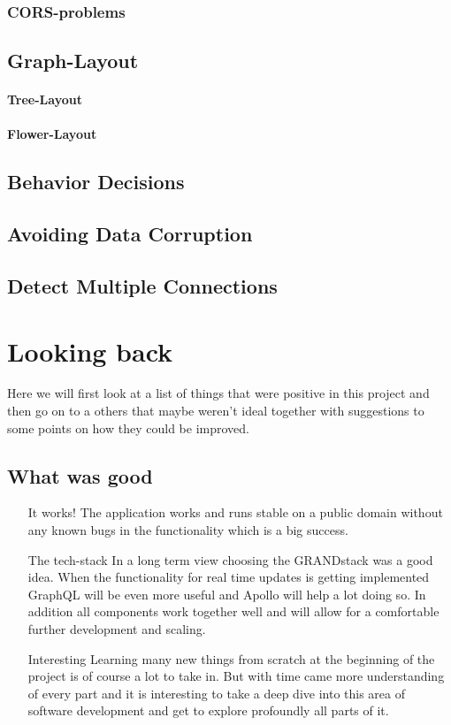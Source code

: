 \subsection{CORS-problems}
\section{Graph-Layout}
\subsubsection{Tree-Layout}
\subsubsection{Flower-Layout}
\section{Behavior Decisions}
\section{Avoiding Data Corruption}
\section{Detect Multiple Connections}

\chapter{Looking back}
\label{chap:LB}
Here we will first look at a list of things that were positive in this project and then go on to a others that maybe weren't ideal together with suggestions to some points on how they could be improved.

\section{What was good}
\begin{itemize}
\item[It works!] The application works and runs stable on a public domain without any known bugs in the functionality which is a big success.
\item[The tech-stack] In a long term view choosing the GRANDstack was a good idea. When the functionality for real time updates is getting implemented GraphQL will be even more useful and Apollo will help a lot doing so. In addition all components work together well and will allow for a comfortable further development and scaling.
\item[Interesting] Learning many new things from scratch at the beginning of the project is of course a lot to take in. But with time came more understanding of every part and it is interesting to take a deep dive into this area of software development and get to explore profoundly all parts of it.
\end{itemize}

